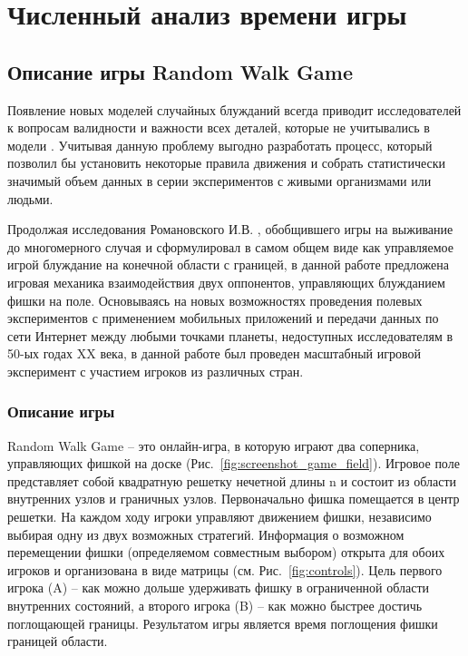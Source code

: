 \chapter{Численный анализ времени игры}\label{ch:ch3}


\section{Описание игры Random Walk Game}\label{sec:ch3/sec1}

Появление новых моделей случайных блужданий всегда приводит исследователей к вопросам валидности и важности всех деталей, которые не учитывались в модели 
\cite{pyke_understanding_2015, lascala-gruenewald_sensory_2019}.
Учитывая данную проблему выгодно разработать процесс, который позволил бы установить некоторые правила движения и собрать статистически значимый 
объем данных в серии экспериментов с живыми организмами или людьми. 

Продолжая исследования Романовского И.В. \cite{romanovsky_1961}, обобщившего игры на выживание до многомерного случая и сформулировал в самом общем виде как управляемое игрой 
блуждание на конечной области с границей, в данной работе предложена игровая механика взаимодействия двух оппонентов, управляющих блужданием 
фишки на поле. Основываясь на новых возможностях проведения полевых экспериментов с применением мобильных приложений и 
передачи данных по сети Интернет между любыми точками планеты, недоступных исследователям в 50-ых годах XX века, в данной работе был проведен масштабный игровой эксперимент 
с участием игроков из различных стран.

\subsection{Описание игры}\label{subsec:ch3/sec1/sub1}

Random Walk Game -- это онлайн-игра, в которую играют два соперника, управляющих фишкой на доске (Рис.~\cref{fig:screenshot_game_field}). 
Игровое поле представляет собой квадратную решетку нечетной длины n и состоит из области внутренних узлов и граничных узлов. 
Первоначально фишка помещается в центр решетки. На каждом ходу игроки управляют движением фишки, независимо выбирая одну из двух возможных стратегий. 
Информация о возможном перемещении фишки (определяемом совместным выбором) открыта для обоих игроков и организована в виде матрицы (см. Рис.~\cref{fig:controls}). 
Цель первого игрока (A) -- как можно дольше удерживать фишку в ограниченной области внутренних состояний, а второго игрока (B) -- 
как можно быстрее достичь поглощающей границы. Результатом игры является время поглощения фишки границей области.
    
